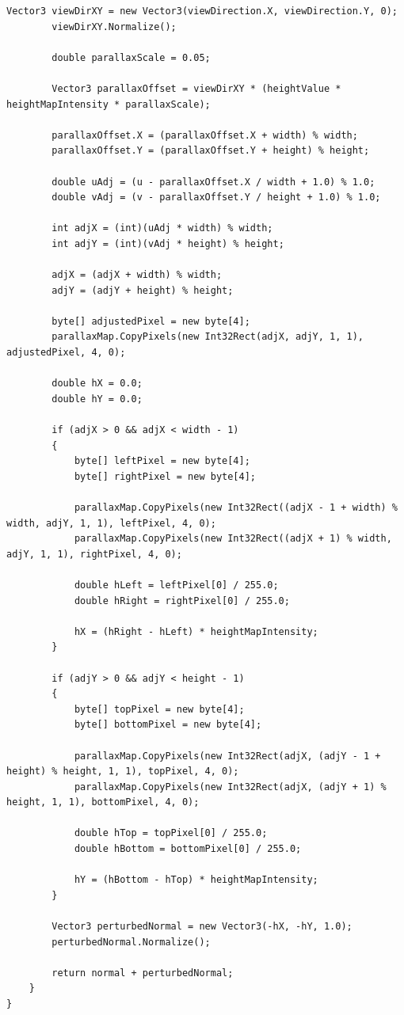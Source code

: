 \begin{lstlisting}[caption={Класс RayTracingService}, label={lst:3-5}]
		Vector3 viewDirXY = new Vector3(viewDirection.X, viewDirection.Y, 0);
		viewDirXY.Normalize();
		
		double parallaxScale = 0.05;
		
		Vector3 parallaxOffset = viewDirXY * (heightValue * heightMapIntensity * parallaxScale);
		
		parallaxOffset.X = (parallaxOffset.X + width) % width;
		parallaxOffset.Y = (parallaxOffset.Y + height) % height;
		
		double uAdj = (u - parallaxOffset.X / width + 1.0) % 1.0;
		double vAdj = (v - parallaxOffset.Y / height + 1.0) % 1.0;
		
		int adjX = (int)(uAdj * width) % width;
		int adjY = (int)(vAdj * height) % height;
		
		adjX = (adjX + width) % width;
		adjY = (adjY + height) % height;
		
		byte[] adjustedPixel = new byte[4];
		parallaxMap.CopyPixels(new Int32Rect(adjX, adjY, 1, 1), adjustedPixel, 4, 0);
		
		double hX = 0.0;
		double hY = 0.0;
		
		if (adjX > 0 && adjX < width - 1)
		{
			byte[] leftPixel = new byte[4];
			byte[] rightPixel = new byte[4];
			
			parallaxMap.CopyPixels(new Int32Rect((adjX - 1 + width) % width, adjY, 1, 1), leftPixel, 4, 0);
			parallaxMap.CopyPixels(new Int32Rect((adjX + 1) % width, adjY, 1, 1), rightPixel, 4, 0);
			
			double hLeft = leftPixel[0] / 255.0;
			double hRight = rightPixel[0] / 255.0;
			
			hX = (hRight - hLeft) * heightMapIntensity;
		}
		
		if (adjY > 0 && adjY < height - 1)
		{
			byte[] topPixel = new byte[4];
			byte[] bottomPixel = new byte[4];
			
			parallaxMap.CopyPixels(new Int32Rect(adjX, (adjY - 1 + height) % height, 1, 1), topPixel, 4, 0);
			parallaxMap.CopyPixels(new Int32Rect(adjX, (adjY + 1) % height, 1, 1), bottomPixel, 4, 0);
			
			double hTop = topPixel[0] / 255.0;
			double hBottom = bottomPixel[0] / 255.0;
			
			hY = (hBottom - hTop) * heightMapIntensity;
		}
		
		Vector3 perturbedNormal = new Vector3(-hX, -hY, 1.0);
		perturbedNormal.Normalize();
		
		return normal + perturbedNormal;
	}
}
\end{lstlisting}

